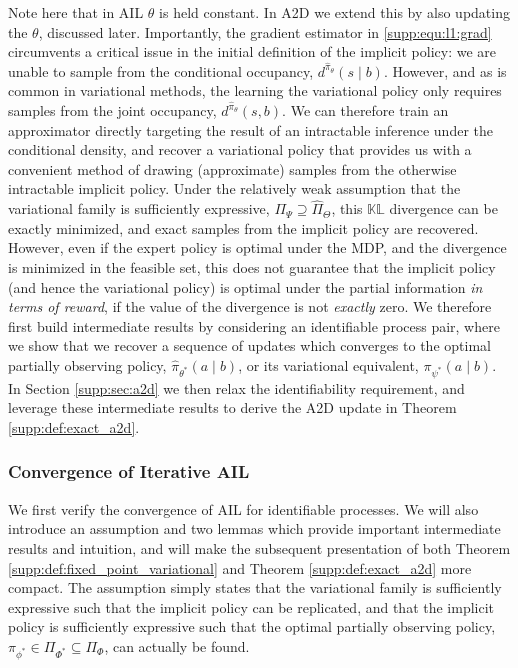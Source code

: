 Note here that in AIL $\theta$ is held constant.  In A2D we extend this by also updating the $\theta$, discussed later.  Importantly, the gradient estimator in \eqref{supp:equ:l1:grad} circumvents a critical issue in the initial definition of the implicit policy: we are unable to sample from the conditional occupancy, $d^{\hat{\pi}_{\theta}}(s \mid b)$.  However, and as is common in variational methods, the learning the variational policy only requires samples from the joint occupancy, $d^{\hat{\pi}_{\theta}}(s,b)$.  We can therefore train an approximator directly targeting the result of an intractable inference under the conditional density, and recover a variational policy that provides us with a convenient method of drawing (approximate) samples from the otherwise intractable implicit policy.  Under the relatively weak assumption that the variational family is sufficiently expressive, $\Pi_{\Psi} \supseteq \hat{\Pi}_{\Theta}$, this $\mathbb{KL}$ divergence can be exactly minimized, and exact samples from the implicit policy are recovered.  However, even if the expert policy is optimal under the MDP, and the divergence is minimized in the feasible set, this does not guarantee that the implicit policy (and hence the variational policy) is optimal under the partial information \emph{in terms of reward}, if the value of the divergence is not \emph{exactly} zero.  We therefore first build intermediate results by considering an identifiable process pair, where we show that we recover a sequence of updates which converges to the optimal partially observing policy, $\hat{\pi}_{\theta^*}(a \mid b)$, or its variational equivalent, $\pi_{\psi^*}(a \mid b)$.  In Section \ref{supp:sec:a2d} we then relax the identifiability requirement, and leverage these intermediate results to derive the A2D update in Theorem \ref{supp:def:exact_a2d}.










\subsubsection{Convergence of Iterative AIL}\label{supp:sec:convergence_of_occ}
We first verify the convergence of AIL for identifiable processes.  We will also introduce an assumption and two lemmas which provide important intermediate results and intuition, and will make the subsequent presentation of both Theorem \ref{supp:def:fixed_point_variational} and Theorem \ref{supp:def:exact_a2d} more compact. The assumption simply states that the variational family is sufficiently expressive such that the implicit policy can be replicated, and that the implicit policy is sufficiently expressive such that the optimal partially observing policy, $\pi_{\phi^*} \in \Pi_{\Phi^*} \subseteq \Pi_{\Phi}$, can actually be found.  

